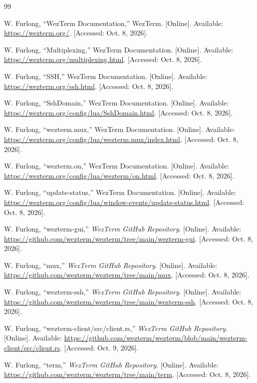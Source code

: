 \begin{thebibliography}{99}

W. Furlong, ``WezTerm Documentation,'' WezTerm.
[Online]. Available: \url{https://wezterm.org/}.
[Accessed: Oct. 8, 2026].

W. Furlong, ``Multiplexing,'' WezTerm Documentation.
[Online]. Available: \url{https://wezterm.org/multiplexing.html}.
[Accessed: Oct. 8, 2026].

W. Furlong, ``SSH,'' WezTerm Documentation.
[Online]. Available: \url{https://wezterm.org/ssh.html}.
[Accessed: Oct. 8, 2026].

W. Furlong, ``SshDomain,'' WezTerm Documentation.
[Online]. Available: \url{https://wezterm.org/config/lua/SshDomain.html}.
[Accessed: Oct. 8, 2026].

W. Furlong, ``wezterm.mux,'' WezTerm Documentation.
[Online]. Available: \url{https://wezterm.org/config/lua/wezterm.mux/index.html}.
[Accessed: Oct. 8, 2026].

W. Furlong, ``wezterm.on,'' WezTerm Documentation.
[Online]. Available: \url{https://wezterm.org/config/lua/wezterm/on.html}.
[Accessed: Oct. 8, 2026].

W. Furlong, ``update-status,'' WezTerm Documentation.
[Online]. Available: \url{https://wezterm.org/config/lua/window-events/update-status.html}.
[Accessed: Oct. 8, 2026].

W. Furlong, ``wezterm-gui,'' \emph{WezTerm GitHub Repository}.
[Online]. Available: \url{https://github.com/wezterm/wezterm/tree/main/wezterm-gui}.
[Accessed: Oct. 8, 2026].

W. Furlong, ``mux,'' \emph{WezTerm GitHub Repository}.
[Online]. Available: \url{https://github.com/wezterm/wezterm/tree/main/mux}.
[Accessed: Oct. 8, 2026].

W. Furlong, ``wezterm-ssh,'' \emph{WezTerm GitHub Repository}.
[Online]. Available: \url{https://github.com/wezterm/wezterm/tree/main/wezterm-ssh}.
[Accessed: Oct. 8, 2026].

W. Furlong, ``wezterm-client/src/client.rs,'' \emph{WezTerm GitHub Repository}.
[Online]. Available: \url{https://github.com/wezterm/wezterm/blob/main/wezterm-client/src/client.rs}.
[Accessed: Oct. 9, 2026].

W. Furlong, ``term,'' \emph{WezTerm GitHub Repository}.
[Online]. Available: \url{https://github.com/wezterm/wezterm/tree/main/term}.
[Accessed: Oct. 8, 2026].


\end{thebibliography}
